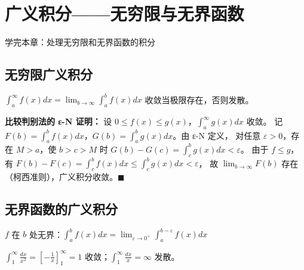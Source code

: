\chapter{广义积分——无穷限与无界函数}
\begin{applicationbox}
学完本章：处理无穷限和无界函数的积分
\end{applicationbox}

\section{无穷限广义积分} \(\int_a^\infty f(x)dx = \lim_{b\to\infty}\int_a^b f(x)dx\)
收敛当极限存在，否则发散。

\textbf{比较判别法的 ε-N 证明：} 设 \(0\le f(x)\le g(x)\)，\(\int_a^\infty g(x)dx\) 收敛。
记 \(F(b)=\int_a^b f(x)dx\)，\(G(b)=\int_a^b g(x)dx\)。由 ε-N 定义，
对任意 \(\varepsilon>0\)，存在 \(M>a\)，使 \(b>c>M\) 时
\(G(b)-G(c)=\int_c^b g(x)dx<\varepsilon\)。
由于 \(f\le g\)，有 \(F(b)-F(c)=\int_c^b f(x)dx\le\int_c^b g(x)dx<\varepsilon\)，
故 \(\lim_{b\to\infty}F(b)\) 存在（柯西准则），广义积分收敛。\(\blacksquare\)

\section{无界函数的广义积分} \(f\) 在 \(b\) 处无界：\(\int_a^b f(x)dx = \lim_{\varepsilon\to0^+}\int_a^{b-\varepsilon} f(x)dx\)

\begin{examplebox}[1] \(\int_1^\infty \frac{dx}{x^2} = \left[-\frac1x\right]_1^\infty = 1\) 收敛；\(\int_1^\infty \frac{dx}{x} = \infty\) 发散。\end{examplebox}

